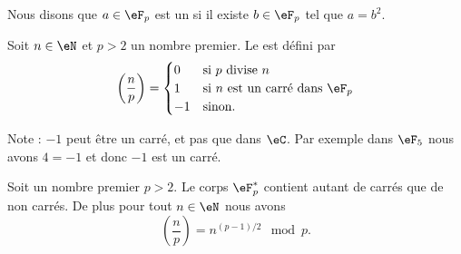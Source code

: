 Nous disons que \( a\in \eF_p\) est un  si il existe \( b\in \eF_p\) tel que \( a=b^2\).

\begin{definition}
	Soit \( n\in \eN\) et \( p>2\) un nombre premier. Le  est défini par
	\begin{equation}
		\left( \frac{ n }{ p } \right)=\begin{cases}
			0  & \text{si } p\text{ divise } n                \\
			1  & \text{si } n\text{ est un carré dans } \eF_p \\
			-1 & \text{sinon}.
		\end{cases}
	\end{equation}
\end{definition}

Note : \( -1\) peut être un carré, et pas que dans \( \eC\). Par exemple dans \( \eF_5\) nous avons \( 4=-1\) et donc \( -1\) est un carré.

\begin{proposition} \label{PropcGsJjk}
	Soit un nombre premier \( p>2\). Le corps \( \eF_p^*\) contient autant de carrés que de non carrés. De plus pour tout \( n\in \eN\) nous avons
	\begin{equation}    \label{Eqbcugos}
		\left(\frac{n}{p}\right)=n^{(p-1)/2}\mod p.
	\end{equation}
\end{proposition}

